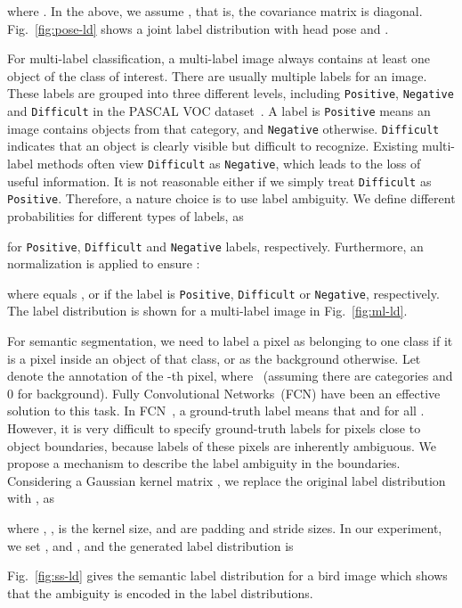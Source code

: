 \documentclass[journal]{IEEEtran}
\begin{document}
where
.
In the above, we assume , that is, the covariance matrix is diagonal. Fig.~\ref{fig:pose-ld} shows a joint label distribution with head pose  and .

For multi-label classification, a multi-label image always contains at least one object of the class of interest. There are usually multiple labels for an image. These labels are grouped into three different levels, including \texttt{Positive}, \texttt{Negative} and \texttt{Difficult} in the PASCAL VOC dataset~\cite{everingham2010pascal}. A label is \texttt{Positive} means an image contains objects from that category, and \texttt{Negative} otherwise. \texttt{Difficult} indicates that an object is clearly visible but difficult to recognize. Existing multi-label methods often view \texttt{Difficult} as \texttt{Negative}, which leads to the loss of useful information. It is not reasonable either if we simply treat \texttt{Difficult} as \texttt{Positive}. Therefore, a nature choice is to use label ambiguity. We define different probabilities for different types of labels, as

for \texttt{Positive}, \texttt{Difficult} and \texttt{Negative} labels, respectively. Furthermore, an  normalization is applied to ensure :

where  equals ,  or  if the label  is \texttt{Positive}, \texttt{Difficult} or \texttt{Negative}, respectively. The label distribution is shown for a multi-label image in Fig.~\ref{fig:ml-ld}.

For semantic segmentation, we need to label a pixel as belonging to one class if it is a pixel inside an object of that class, or as the background otherwise. Let  denote the annotation of the -th pixel, where ~(assuming there are  categories and 0 for background). Fully Convolutional Networks~(FCN) have been an effective solution to this task. In FCN~\cite{long2015fully}, a ground-truth label  means that  and  for all . However, it is very difficult to specify ground-truth labels for pixels close to object boundaries, because labels of these pixels are inherently ambiguous. We propose a mechanism to describe the label ambiguity in the boundaries. Considering a Gaussian kernel matrix , we replace the original label distribution  with , as

where , ,  is the kernel size,  and  are padding and stride sizes. In our experiment, we set ,  and , and the generated label distribution is

Fig.~\ref{fig:ss-ld} gives the semantic label distribution for a bird image which shows that the ambiguity is encoded in the label distributions.
\end{document}
